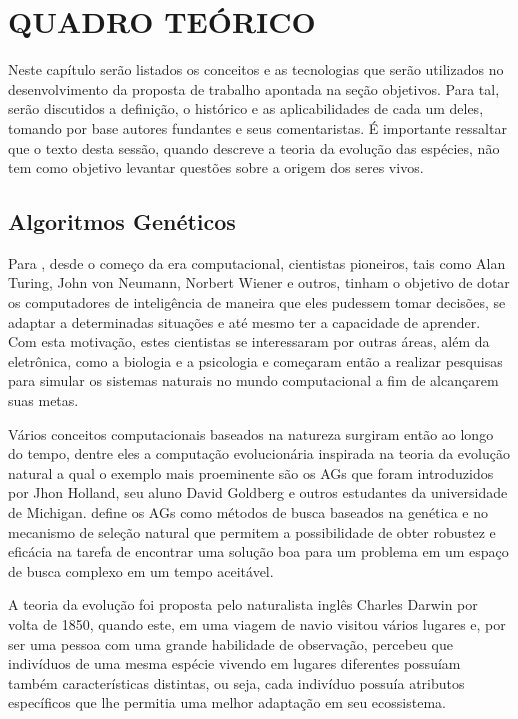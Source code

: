 \chapter{QUADRO TEÓRICO}

\par Neste capítulo serão listados os conceitos e as tecnologias que serão
utilizados no desenvolvimento da proposta de trabalho apontada na seção 
objetivos. Para tal, serão discutidos a definição, o histórico e as 
aplicabilidades de cada um deles, tomando por base autores fundantes e 
seus comentaristas. É importante ressaltar que o texto desta sessão, quando
descreve a teoria da evolução das espécies, não tem como objetivo levantar
questões sobre a origem dos seres vivos.

\section{Algoritmos Genéticos}


\par Para , desde o começo da
era computacional, cientistas pioneiros, tais como Alan Turing, John von
Neumann, Norbert Wiener e outros, tinham o objetivo de dotar os computadores de inteligência
de maneira que eles pudessem tomar decisões, se adaptar a determinadas situações
e até mesmo ter a capacidade de aprender. Com esta motivação, estes cientistas
se interessaram por outras áreas, além da eletrônica, como  a
biologia e a psicologia e começaram então a realizar pesquisas para simular os
sistemas naturais no mundo computacional a fim de alcançarem suas metas. 

\par Vários conceitos computacionais baseados na natureza surgiram então ao
longo do tempo, dentre eles a computação evolucionária inspirada na teoria da evolução natural
a qual o exemplo mais proeminente são os AGs que foram introduzidos por Jhon Holland, seu aluno
David Goldberg e outros estudantes da universidade de Michigan.
 define os AGs como métodos de busca baseados na
genética e no mecanismo de seleção natural que permitem a possibilidade de obter
robustez e eficácia na tarefa de encontrar uma solução boa para um problema em um espaço de busca
complexo em um tempo aceitável.


\par A teoria da evolução foi proposta pelo naturalista inglês Charles
Darwin por volta de 1850, quando este, em uma viagem de navio visitou vários lugares e, 
por ser uma pessoa com uma grande habilidade de  observação, percebeu que
indivíduos de uma mesma espécie vivendo em lugares diferentes possuíam também
características distintas, ou seja, cada indivíduo  possuía atributos
específicos que lhe permitia uma melhor adaptação em seu ecossistema. 


